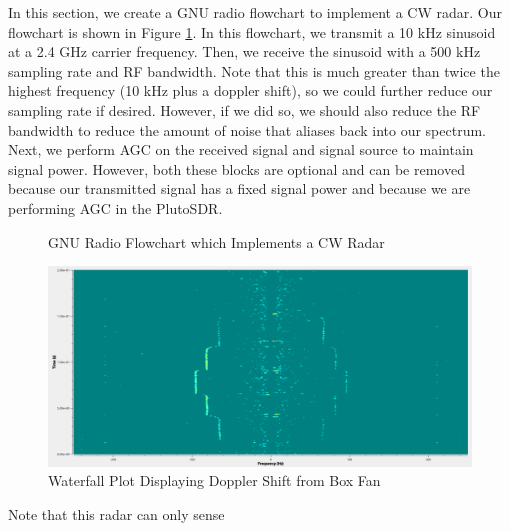 \documentclass{article}
\begin{document}
In this section, we create a GNU radio flowchart to implement a CW radar. Our flowchart is shown in Figure \ref{fig::gnu_radio_block_diagram}. In this flowchart, we transmit a 10 kHz sinusoid at a 2.4 GHz carrier frequency. Then, we receive the sinusoid with a 500 kHz sampling rate and RF bandwidth. Note that this is much greater than twice the highest frequency (10 kHz plus a doppler shift), so we could further reduce our sampling rate if desired. However, if we did so, we should also reduce the RF bandwidth to reduce the amount of noise that aliases back into our spectrum. Next, we perform AGC on the received signal and signal source to maintain signal power. However, both these blocks are optional and can be removed because our transmitted signal has a fixed signal power and because we are performing AGC in the PlutoSDR. 

\begin{figure}[H]
    	\centering
    	\caption{GNU Radio Flowchart which Implements a CW Radar}
    	\label{fig::gnu_radio_block_diagram}
\end{figure}

\begin{figure}[H]
    	\centering
    \includegraphics[width=0.9\linewidth]{dopp_spectrum.png}
    	\caption{Waterfall Plot Displaying Doppler Shift from Box Fan}
    	\label{fig::dopp_spectrum}
\end{figure}

Note that this radar can only sense 
\end{document}
